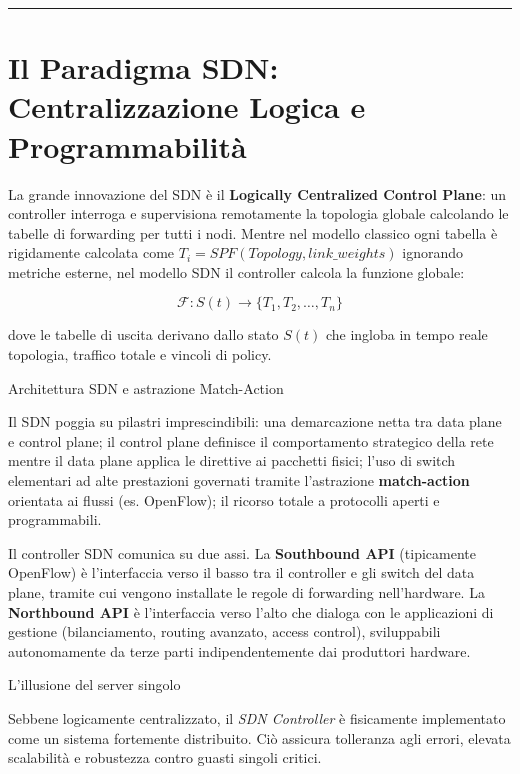 \documentclass[
  italian,
  openany]{book}
\begin{document}
\begin{center}\rule{0.5\linewidth}{0.5pt}\end{center}

\section{Il Paradigma SDN: Centralizzazione Logica e
Programmabilità}\label{il-paradigma-sdn-centralizzazione-logica-e-programmabilituxe0}

La grande innovazione del SDN è il \textbf{Logically Centralized Control
Plane}: un controller interroga e supervisiona remotamente la topologia
globale calcolando le tabelle di forwarding per tutti i nodi. Mentre nel
modello classico ogni tabella è rigidamente calcolata come
\(T_{i} = SPF(Topology, link\_weights)\) ignorando metriche esterne, nel
modello SDN il controller calcola la funzione globale:

\[
\mathcal{F}: S(t) \rightarrow \{T_1, T_2, \ldots, T_n\}
\]

dove le tabelle di uscita derivano dallo stato \(S(t)\) che ingloba in
tempo reale topologia, traffico totale e vincoli di policy.

\begin{calloutimportant}{Architettura SDN e astrazione Match-Action}

Il SDN poggia su pilastri imprescindibili: una demarcazione netta tra
data plane e control plane; il control plane definisce il comportamento
strategico della rete mentre il data plane applica le direttive ai
pacchetti fisici; l'uso di switch elementari ad alte prestazioni
governati tramite l'astrazione \textbf{match-action} orientata ai flussi
(es. OpenFlow); il ricorso totale a protocolli aperti e programmabili.

\end{calloutimportant}

Il controller SDN comunica su due assi. La \textbf{Southbound API}
(tipicamente OpenFlow) è l'interfaccia verso il basso tra il controller
e gli switch del data plane, tramite cui vengono installate le regole di
forwarding nell'hardware. La \textbf{Northbound API} è l'interfaccia
verso l'alto che dialoga con le applicazioni di gestione (bilanciamento,
routing avanzato, access control), sviluppabili autonomamente da terze
parti indipendentemente dai produttori hardware.

\begin{calloutwarning}{L’illusione del server singolo}

Sebbene logicamente centralizzato, il \emph{SDN Controller} è
fisicamente implementato come un sistema fortemente distribuito. Ciò
assicura tolleranza agli errori, elevata scalabilità e robustezza contro
guasti singoli critici.

\end{calloutwarning}
\end{document}
